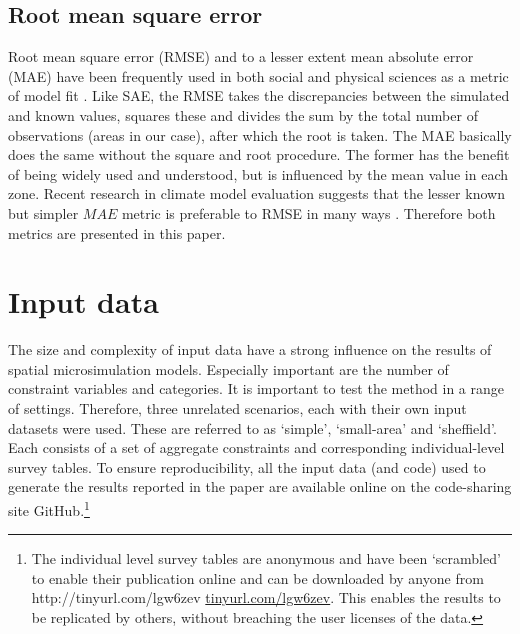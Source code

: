 \documentclass[a4paper,10pt]{article}
\begin{document}


\subsection{Root mean square error}
Root mean square error (RMSE) and to a lesser extent mean absolute error (MAE)
have been frequently
used in both social and physical sciences as a metric of model fit
\citep{Legates1999GOF,Ngo2012}. %
Like SAE, the RMSE takes the
discrepancies between the simulated and known values, squares these and
divides the sum by the total number of observations (areas in our case), after
which the root is taken. The MAE basically does the same without the square and
root procedure.  The former has the benefit of being widely used and understood,
but is
influenced by the mean value in each zone. Recent research in climate model
evaluation suggests that the lesser known but simpler $MAE$ metric is preferable
to RMSE in many ways \citep{Willmott2005}. Therefore both metrics are presented
in this paper.

\section{Input data}
The size and complexity of input data have a strong
influence on the results of spatial microsimulation models.
Especially important are the
number of constraint variables and categories.
It is important to test the method in a range of settings.
Therefore, three unrelated scenarios, each with their own input datasets
were used. These are referred to as `simple', `small-area' and
`sheffield'. Each consists of a set of aggregate constraints and corresponding
individual-level survey tables.
To ensure reproducibility, all the input data (and code)
used to generate the results reported
in the paper are available online on the code-sharing site
GitHub.\footnote{The individual level survey tables
are anonymous and have been `scrambled' to enable their
publication online and can be downloaded by anyone from
http://tinyurl.com/lgw6zev
\href{http://tinyurl.com/lgw6zev}{tinyurl.com/lgw6zev}.
This enables the results to be replicated by others,
without breaching the user licenses of the data.}
\end{document}
